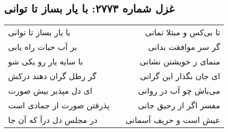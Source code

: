 \begin{center}
\section*{غزل شماره ۲۷۷۳: با یار بساز تا توانی}
\label{sec:2773}
\begin{longtable}{l p{0.5cm} r}
با یار بساز تا توانی
&&
تا بی‌کس و مبتلا نمانی
\\
بر آب حیات راه یابی
&&
گر سر موافقت بدانی
\\
با سایه یار رو یکی شو
&&
منمای ز خویشتن نشانی
\\
گر رطل گران دهند درکش
&&
ای جان بگذار این گرانی
\\
ای دل مپذیر بیش صورت
&&
می‌باش چو آب در روانی
\\
پذرفتن صورت از جمادی است
&&
مفسر اگر از رحیق جانی
\\
در مجلس دل درآ که آن جا
&&
عیش است و حریف آسمانی
\\
\end{longtable}
\end{center}
